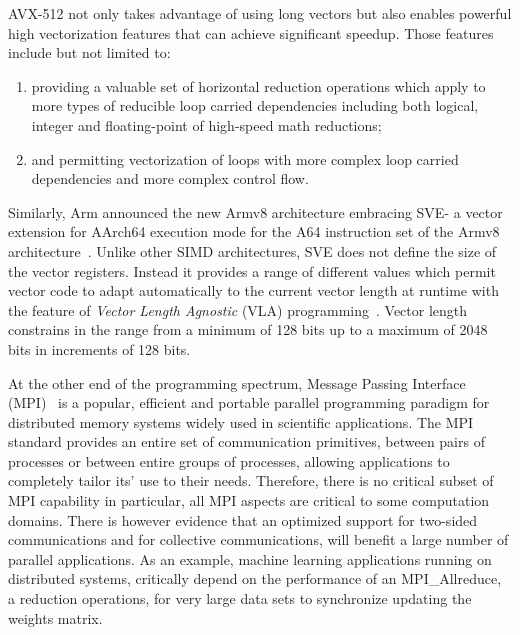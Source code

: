 \documentclass[sigconf]{acmart}
\newcommand{\mpi}[0]{\textsc{MPI}\xspace}
\newcommand{\arm}[0]{Arm\xspace}
\newcommand{\sve}[0]{\textsc{SVE}\xspace}
\begin{document}
AVX-512 not only takes advantage of using long vectors but also enables powerful high
vectorization features that can achieve significant speedup. Those features
include but not limited to:
\begin{enumerate}
  \item providing a valuable set of horizontal reduction operations which apply to more
  types of reducible loop carried dependencies including both logical, integer
  and floating-point of high-speed math reductions;
  \item and permitting vectorization of loops with more complex loop carried dependencies and more complex control flow.
\end{enumerate}

Similarly, \arm announced the new Armv8 architecture embracing \sve - a vector extension for AArch64
execution mode for the A64 instruction set of the
Armv8 architecture~\cite{arm-v8-ref, ARMv8-Architecture}.
Unlike other SIMD architectures, \sve does not define the size of
the vector registers. Instead it provides a range of different values which permit vector
code to adapt automatically to the current vector length at runtime with the
feature of \emph{Vector Length Agnostic} (VLA) programming~\cite{Advanced-SIMD,vla-stencil}.
Vector length constrains in the range from a minimum of 128 bits up to
a maximum of 2048 bits in increments of 128 bits.

At the other end of the programming spectrum, Message Passing Interface
(\mpi)~\cite{mpi-forum} is a popular, efficient and portable parallel programming
paradigm for distributed memory systems widely used in scientific applications.
The MPI standard provides an entire set of communication primitives, between pairs of processes or between entire groups of processes, allowing applications to completely tailor its' use to their needs.
%
Therefore, there is no critical subset of MPI capability in particular, all MPI aspects are critical to some computation domains. There is however evidence that an optimized support for two-sided communications and for collective communications, will benefit a large number of parallel applications. As an example, machine learning applications running on distributed systems,
critically depend on the performance of an MPI\_Allreduce, a reduction operations,
for very large data sets to synchronize updating the weights matrix.
\end{document}
